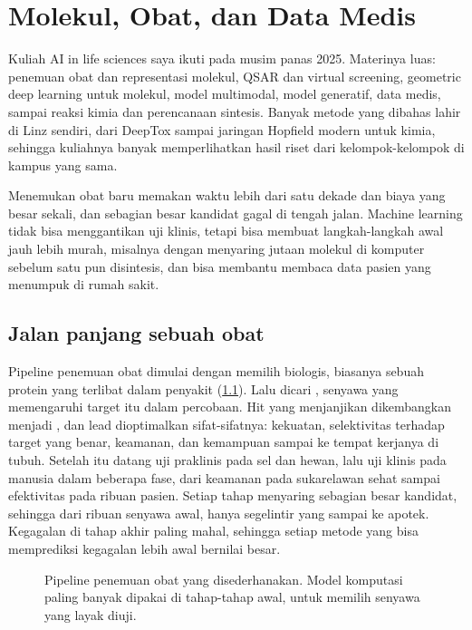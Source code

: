 \chapter{Molekul, Obat, dan Data Medis}
\label{ch:hayati}

Kuliah AI in life sciences saya ikuti pada musim panas 2025. Materinya luas: penemuan obat dan representasi
molekul, QSAR dan virtual screening, geometric deep learning untuk molekul, model multimodal, model generatif, data
medis, sampai reaksi kimia dan perencanaan sintesis. Banyak metode yang dibahas lahir di Linz sendiri, dari DeepTox
sampai jaringan Hopfield modern untuk kimia, sehingga kuliahnya banyak memperlihatkan hasil riset dari
kelompok-kelompok di kampus yang sama.

Menemukan obat baru memakan waktu lebih dari satu dekade dan biaya yang besar sekali, dan sebagian besar kandidat
gagal di tengah jalan. Machine learning tidak bisa menggantikan uji klinis, tetapi bisa membuat langkah-langkah awal
jauh lebih murah, misalnya dengan menyaring jutaan molekul di komputer sebelum satu pun disintesis, dan bisa membantu
membaca data pasien yang menumpuk di rumah sakit.

\section{Jalan panjang sebuah obat}

Pipeline penemuan obat dimulai dengan memilih  biologis, biasanya sebuah protein yang terlibat dalam
penyakit (\cref{fig:pipeline}). Lalu dicari , senyawa yang memengaruhi target itu dalam percobaan. Hit yang
menjanjikan dikembangkan menjadi , dan lead dioptimalkan sifat-sifatnya: kekuatan, selektivitas terhadap
target yang benar, keamanan, dan kemampuan sampai ke tempat kerjanya di tubuh. Setelah itu datang uji praklinis pada sel
dan hewan, lalu uji klinis pada manusia dalam beberapa fase, dari keamanan pada sukarelawan sehat sampai efektivitas pada
ribuan pasien. Setiap tahap menyaring sebagian besar kandidat, sehingga dari ribuan senyawa awal, hanya segelintir yang
sampai ke apotek. Kegagalan di tahap akhir paling mahal, sehingga setiap metode yang bisa memprediksi kegagalan lebih
awal bernilai besar.

\begin{figure}[ht]
\centering
{}
\caption{Pipeline penemuan obat yang disederhanakan. Model komputasi paling banyak dipakai di tahap-tahap awal, untuk
memilih senyawa yang layak diuji.}
\label{fig:pipeline}
\end{figure}

